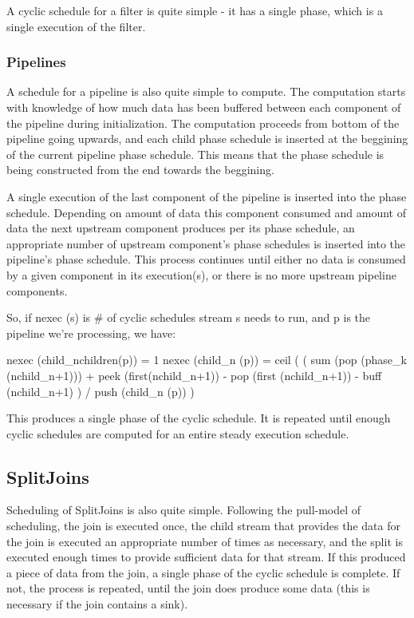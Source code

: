 A cyclic schedule for a filter is quite simple - it has a single phase,
which is a single execution of the filter.

\subsubsection{Pipelines}

A schedule for a pipeline is also quite simple to compute.  The
computation starts with knowledge of how much data has been buffered
between each component of the pipeline during initialization.  The
computation proceeds from bottom of the pipeline going upwards, and each
child phase schedule is inserted at the beggining of the current pipeline
phase schedule.  This means that the phase schedule is being constructed
from the end towards the beggining.

A single execution of the last component of the pipeline is inserted into
the phase schedule.  Depending on amount of data this component consumed
and amount of data the next upstream component produces per its phase
schedule, an appropriate number of upstream component's phase schedules is
inserted into the pipeline's phase schedule.  This process continues until
either no data is consumed by a given component in its execution(s), or
there is no more upstream pipeline components.

So, if nexec (s) is # of cyclic schedules stream s needs to run, and p is
the pipeline we're processing, we have:

nexec (child_{nchildren(p)}) = 1
nexec (child_n (p)) = ceil (
                             (   sum (pop (phase_k (nchild_{n+1})))
     			       + peek (first(nchild_{n+1})) - pop (first (nchild_{n+1}))
                               - buff (nchild_{n+1})
		             ) 
			     / push (child_n (p))
			   )

This produces a single phase of the cyclic schedule.  It is repeated until
enough cyclic schedules are computed for an entire steady execution
schedule.

\subsection{SplitJoins}

Scheduling of SplitJoins is also quite simple.  Following the pull-model
of scheduling, the join is executed once, the child stream that provides
the data for the join is executed an appropriate number of times as
necessary, and the split is executed enough times to provide sufficient data
for that stream.  If this produced a piece of data from the join, a single
phase of the cyclic schedule is complete.  If not, the process is
repeated, until the join does produce some data (this is necessary if the
join contains a sink).

